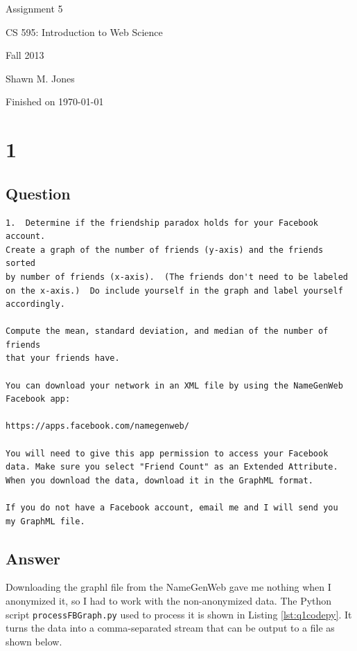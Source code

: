 \documentclass[letterpaper,11pt]{article}
\begin{document}
\begin{titlepage}

\begin{center}

\Huge{Assignment 5}

\Large{CS 595:  Introduction to Web Science}

\Large{Fall 2013}

\Large{Shawn M. Jones}

\Large Finished on \today

\end{center}

\end{titlepage}

\newpage
\section*{1}

\subsection*{Question}

\begin{verbatim}
1.  Determine if the friendship paradox holds for your Facebook account.  
Create a graph of the number of friends (y-axis) and the friends sorted
by number of friends (x-axis).  (The friends don't need to be labeled 
on the x-axis.)  Do include yourself in the graph and label yourself
accordingly.

Compute the mean, standard deviation, and median of the number of friends
that your friends have.

You can download your network in an XML file by using the NameGenWeb
Facebook app: 

https://apps.facebook.com/namegenweb/ 

You will need to give this app permission to access your Facebook
data. Make sure you select "Friend Count" as an Extended Attribute.
When you download the data, download it in the GraphML format.

If you do not have a Facebook account, email me and I will send you 
my GraphML file.
\end{verbatim}

\newpage
\subsection*{Answer}

Downloading the graphl file from the NameGenWeb gave me nothing when I anonymized it, so I had to work with the non-anonymized data.  The Python script \verb+processFBGraph.py+ used to process it is shown in Listing \ref{lst:q1codepy}.  It turns the data into a comma-separated stream that can be output to a file as shown below.
\end{document}
